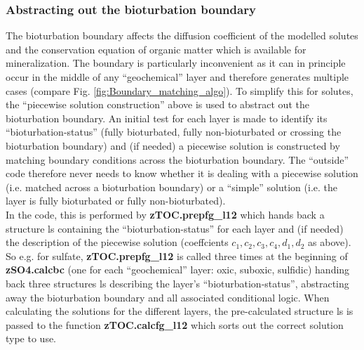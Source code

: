 \documentclass[gmd, manuscript]{copernicus}
\begin{document}

\subsubsection*{Abstracting out the bioturbation boundary}
The bioturbation boundary affects the diffusion coefficient of the modelled solutes and the conservation equation of organic matter which is available for mineralization. 
The boundary is particularly inconvenient as it can in principle occur in the middle of any ``geochemical'' layer and therefore generates multiple cases (compare Fig. \ref{fig:Boundary_matching_algo}). 
To simplify this for solutes, the ``piecewise solution construction'' above is used to abstract out the bioturbation boundary. 
An initial test for each layer is made to identify its ``bioturbation-status'' (fully bioturbated, fully non-bioturbated or crossing the bioturbation boundary) and (if needed) a piecewise solution is 
constructed by matching boundary conditions across the bioturbation boundary. 
The ``outside'' code therefore never needs to know whether it is dealing with a piecewise solution (i.e. matched across a bioturbation boundary) or a ``simple'' solution (i.e. the layer is fully bioturbated
or fully non-bioturbated).\\[1em]
In the code, this is performed by \textsf{\textbf{zTOC.prepfg\_l12}} which hands back a structure \textsf{ls} containing the ``bioturbation-status'' for each layer and (if needed) 
the description of the piecewise solution (coeffcients $c_1, c_2, c_3, c_4, d_1, d_2$ as above). So e.g. for sulfate, \textsf{\textbf{zTOC.prepfg\_l12}} is called three times at the beginning of \textsf{\textbf{zSO4.calcbc}} 
(one for each ``geochemical'' layer: oxic, suboxic, sulfidic) handing back three structures \textsf{ls} describing the layer's ``bioturbation-status'', abstracting away the bioturbation boundary and all associated conditional logic. 
When calculating the solutions for the different layers, the pre-calculated structure \textsf{ls} is passed to the function \textsf{\textbf{zTOC.calcfg\_l12}} which sorts out the correct
solution type to use.
\end{document}

